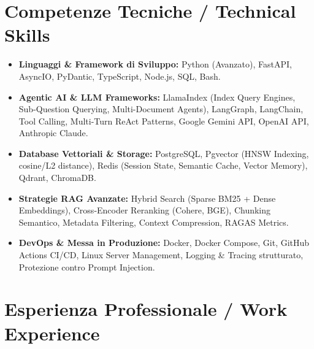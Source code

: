 \documentclass[a4paper,10pt]{article}
\begin{document}
\section{Competenze Tecniche / Technical Skills}
\begin{itemize}[leftmargin=1.2em, itemsep=2pt]
  \item \textbf{Linguaggi \& Framework di Sviluppo:} Python (Avanzato), FastAPI, AsyncIO, PyDantic, TypeScript, Node.js, SQL, Bash.
  \item \textbf{Agentic AI \& LLM Frameworks:} LlamaIndex (Index Query Engines, Sub-Question Querying, Multi-Document Agents), LangGraph, LangChain, Tool Calling, Multi-Turn ReAct Patterns, Google Gemini API, OpenAI API, Anthropic Claude.
  \item \textbf{Database Vettoriali \& Storage:} PostgreSQL, Pgvector (HNSW Indexing, cosine/L2 distance), Redis (Session State, Semantic Cache, Vector Memory), Qdrant, ChromaDB.
  \item \textbf{Strategie RAG Avanzate:} Hybrid Search (Sparse BM25 + Dense Embeddings), Cross-Encoder Reranking (Cohere, BGE), Chunking Semantico, Metadata Filtering, Context Compression, RAGAS Metrics.
  \item \textbf{DevOps \& Messa in Produzione:} Docker, Docker Compose, Git, GitHub Actions CI/CD, Linux Server Management, Logging \& Tracing strutturato, Protezione contro Prompt Injection.
\end{itemize}

\section{Esperienza Professionale / Work Experience}
\end{document}

